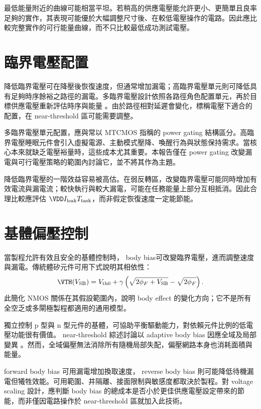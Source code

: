 最低能量附近的曲線可能相當平坦。若稍高的供應電壓能允許更小、更簡單且良率足夠的實作，其表現可能優於大幅調整尺寸後、在較低電壓操作的電路。因此應比較完整實作的可行能量曲線，而不只比較最低成功測試電壓。

\section{臨界電壓配置}
降低臨界電壓可在降壓後恢復速度，但通常增加漏電；高臨界電壓單元則可降低具有足夠時序餘裕之路徑的漏電。多臨界電壓設計依照各路徑角色配置單元，再於目標供應電壓重新評估時序與能量 \cite{chandrakasan1992,gonzalez1997}。由於路徑相對延遲會變化，標稱電壓下適合的配置，在 near-threshold 區可能需要調整。

多臨界電壓單元配置，應與常以 MTCMOS 指稱的 power gating 結構區分。高臨界電壓睡眠元件會引入虛擬電源、主動模式壓降、喚醒行為與狀態保持需求。當核心本來就缺乏電壓裕量時，這些成本尤其重要。本報告僅在 power gating 改變漏電與可行電壓策略的範圍內討論它，並不將其作為主題。

降低臨界電壓的一階效益容易被高估。在弱反轉區，改變臨界電壓可能同時增加有效電流與漏電流；較快執行與較大漏電，可能在任務能量上部分互相抵消。因此合理比較應評估 $\VDD I_{\mathrm{leak}}T_{\mathrm{task}}$，而非假定恢復速度一定能節能。

\section{基體偏壓控制}
當製程允許有效且安全的基體控制時， body bias可改變臨界電壓，進而調整速度與漏電。傳統體矽元件可用下式說明其相依性：
\begin{equation}
\VTH(V_{\mathrm{SB}})=V_{\mathrm{th0}}+
\gamma\left(\sqrt{2\phi_F+V_{\mathrm{SB}}}-\sqrt{2\phi_F}\right).
\end{equation}
此簡化 NMOS 關係在其假設範圍內，說明 body effect 的變化方向；它不是所有全空乏或多閘極製程都適用的通用模型。

獨立控制 p 型與 n 型元件的基體，可協助平衡驅動能力，對依賴元件比例的低電壓功能很有價值。 near-threshold 綜述討論以 adaptive body bias 因應全域及局部變異 \cite[Sec.~V-B]{dreslinski2010}。然而，全域偏壓無法消除所有隨機局部失配，偏壓網路本身也消耗面積與能量。

 forward body bias 可用漏電增加換取速度， reverse body bias 則可能降低待機漏電但犧牲效能。可用範圍、井隔離、接面限制與敏感度都取決於製程。對 voltage scaling 設計，應判斷 body bias 的總成本是否小於更佳供應電壓設定帶來的節能，而非僅因電路操作於 near-threshold 區就加入此技術。

